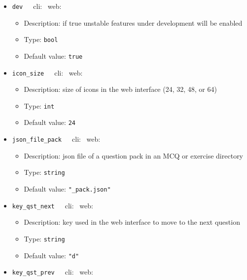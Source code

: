 {\begin{itemize}[itemsep=0pt,parsep=0pt,topsep=0pt,partopsep=0pt]
  \begin{itemize}[itemsep=0pt,parsep=0pt,topsep=0pt,partopsep=0pt]
  \item Description:  if true exception tracebacks will be displayed in web browser
  \item Type:  {\tt{bool}}
  \item Default value:  {\tt{true}}
  \end{itemize}
\item{\tt{dev}}~~~cli: \xmark~web: \cmark
  \begin{itemize}[itemsep=0pt,parsep=0pt,topsep=0pt,partopsep=0pt]
  \item Description:  if true unstable features under development will be enabled
  \item Type:  {\tt{bool}}
  \item Default value:  {\tt{true}}
  \end{itemize}
\item{\tt{icon\_size}}~~~cli: \xmark~web: \cmark
  \begin{itemize}[itemsep=0pt,parsep=0pt,topsep=0pt,partopsep=0pt]
  \item Description:  size of icons in the web interface (24, 32, 48, or 64)
  \item Type:  {\tt{int}}
  \item Default value:  {\tt{24}}
  \end{itemize}
\item{\tt{json\_file\_pack}}~~~cli: \cmark~web: \xmark
  \begin{itemize}[itemsep=0pt,parsep=0pt,topsep=0pt,partopsep=0pt]
  \item Description:  json file of a question pack in an MCQ or exercise directory
  \item Type:  {\tt{string}}
  \item Default value:  {\tt{"\_pack.json"}}
  \end{itemize}
\item{\tt{key\_qst\_next}}~~~cli: \xmark~web: \cmark
  \begin{itemize}[itemsep=0pt,parsep=0pt,topsep=0pt,partopsep=0pt]
  \item Description:  key used in the web interface to move to the next question
  \item Type:  {\tt{string}}
  \item Default value:  {\tt{"d"}}
  \end{itemize}
\item{\tt{key\_qst\_prev}}~~~cli: \xmark~web: \cmark
  \begin{itemize}[itemsep=0pt,parsep=0pt,topsep=0pt,partopsep=0pt]

\end{itemize}
\end{itemize}}
